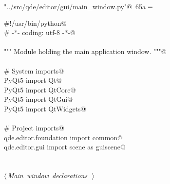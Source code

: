 \documentclass[
    a4paper,      %
    10pt,         %
    openright,    %
    notitlepage,  %
    parskip=half, %
]{scrreprt}       %
\theoremstyle{definition}                    %
\begin{document}
\begin{flushleft} \small
\begin{minipage}{\linewidth}\label{scrap109}\raggedright\small
{} \verb@"../src/qde/editor/gui/main_window.py"@\nobreak\ {\footnotesize {65a}}$\equiv$
\vspace{-1ex}
\begin{list}{}{} \item
\mbox{}\lstinline@#!/usr/bin/python@\\
\mbox{}\lstinline@# -*- coding: utf-8 -*-@\\
\mbox{}\lstinline@@\\
\mbox{}\lstinline@""" Module holding the main application window. """@\\
\mbox{}\lstinline@@\\
\mbox{}\lstinline@# System imports@\\
\mbox{}\lstinline@from PyQt5 import Qt@\\
\mbox{}\lstinline@from PyQt5 import QtCore@\\
\mbox{}\lstinline@from PyQt5 import QtGui@\\
\mbox{}\lstinline@from PyQt5 import QtWidgets@\\
\mbox{}\lstinline@@\\
\mbox{}\lstinline@# Project imports@\\
\mbox{}\lstinline@from qde.editor.foundation import common@\\
\mbox{}\lstinline@from qde.editor.gui import scene as guiscene@\\
\mbox{}\lstinline@@\\
\mbox{}\lstinline@@\\
\mbox{}\lstinline@@\hbox{$\langle\,${\itshape Main window declarations}\nobreak\ {\footnotesize {}}$\,\rangle$}\lstinline@@\\
\mbox{}\lstinline@@{\NWsep}
\end{list}
\vspace{-1.5ex}
\footnotesize
\begin{list}{}{\setlength{\itemsep}{-\parsep}\setlength{\itemindent}{-\leftmargin}}

\item{}
\end{list}
\end{minipage}\vspace{4ex}
\end{flushleft}
\end{document}
